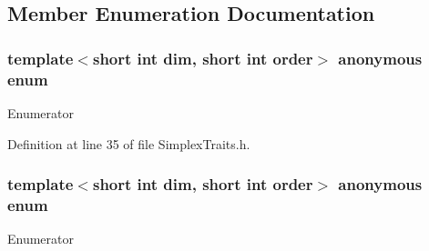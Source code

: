 \subsection{Member Enumeration Documentation}
\hypertarget{structmodel_1_1_simplex_traits_adeb0679d9699101e030e5d94844fab73}{}\subsubsection[{anonymous enum}]{\setlength{\rightskip}{0pt plus 5cm}template$<$short int dim, short int order$>$ anonymous enum}\label{structmodel_1_1_simplex_traits_adeb0679d9699101e030e5d94844fab73}
\begin{Desc}
\item[Enumerator]\par
\begin{description}
\item[{\em 
\hypertarget{structmodel_1_1_simplex_traits_adeb0679d9699101e030e5d94844fab73a4e2dd425af75e4abeaa495c82bf5456b}{}n\+Vertices\label{structmodel_1_1_simplex_traits_adeb0679d9699101e030e5d94844fab73a4e2dd425af75e4abeaa495c82bf5456b}
}]\end{description}
\end{Desc}


Definition at line 35 of file Simplex\+Traits.\+h.

\hypertarget{structmodel_1_1_simplex_traits_a05512c4debd6223f44111cbfb0956ffd}{}\subsubsection[{anonymous enum}]{\setlength{\rightskip}{0pt plus 5cm}template$<$short int dim, short int order$>$ anonymous enum}\label{structmodel_1_1_simplex_traits_a05512c4debd6223f44111cbfb0956ffd}
\begin{Desc}
\item[Enumerator]\par
\begin{description}
\item[{\em 
\hypertarget{structmodel_1_1_simplex_traits_a05512c4debd6223f44111cbfb0956ffda7eb369326a8fa17f33eea1abd374caa7}{}n\+Edges\label{structmodel_1_1_simplex_traits_a05512c4debd6223f44111cbfb0956ffda7eb369326a8fa17f33eea1abd374caa7}
}]\end{description}
\end{Desc}



